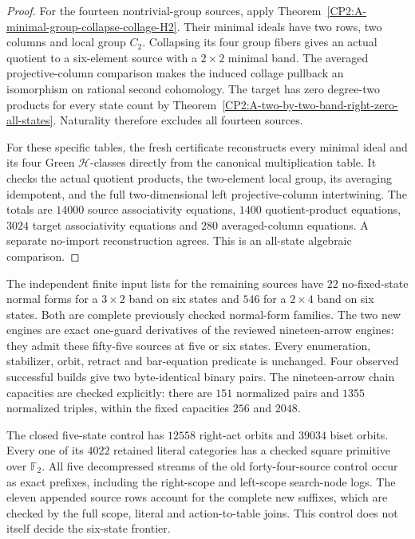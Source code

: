 \begin{proof}
For the fourteen nontrivial-group sources, apply
Theorem~\ref{CP2:A-minimal-group-collapse-collage-H2}.
Their minimal ideals have two rows, two columns and local
group $C_2$.  Collapsing its four group fibers gives an actual
quotient to a six-element source with a $2\times2$ minimal band.
The averaged projective-column comparison makes the induced
collage pullback an isomorphism on rational second cohomology.
The target has zero degree-two products for every state count
by Theorem~\ref{CP2:A-two-by-two-band-right-zero-all-states}.
Naturality therefore excludes all fourteen sources.

For these specific tables, the fresh certificate
reconstructs every minimal ideal and its four Green
$\mathcal H$-classes directly from the canonical multiplication
table.  It checks the actual quotient products, the two-element
local group, its averaging idempotent, and the full two-dimensional
left projective-column intertwining.  The totals are $14000$
source associativity equations, $1400$ quotient-product equations,
$3024$ target associativity equations and $280$ averaged-column
equations.  A separate no-import reconstruction agrees.
This is an all-state algebraic comparison.
\end{proof}

The independent finite input lists for the remaining sources have
$22$ no-fixed-state normal forms for a $3\times2$ band on six
states and $546$ for a $2\times4$ band on six states.  Both are
complete previously checked normal-form families.
The two new engines are exact one-guard derivatives of the
reviewed nineteen-arrow engines: they admit these fifty-five
sources at five or six states.  Every enumeration, stabilizer,
orbit, retract and bar-equation predicate is unchanged.
Four observed successful builds give two byte-identical binary
pairs.  The nineteen-arrow chain capacities are checked explicitly:
there are $151$ normalized pairs and $1355$ normalized triples,
within the fixed capacities $256$ and $2048$.

The closed five-state control has $12558$ right-act orbits and
$39034$ biset orbits.  Every one of its $4022$ retained literal
categories has a checked square primitive over $\mathbb F_2$.
All five decompressed streams of the old forty-four-source
control occur as exact prefixes, including the right-scope and
left-scope search-node logs.  The eleven appended source rows
account for the complete new suffixes, which are checked by the
full scope, literal and action-to-table joins.  This control
does not itself decide the six-state frontier.

